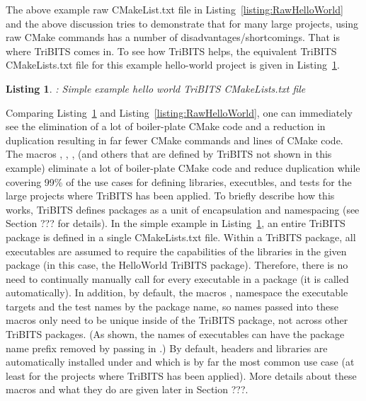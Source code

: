 \documentclass[note]{TechNote}
\newtheorem{listing}{Listing}
\begin{document}
The above example raw CMakeList.txt file in Listing~\ref{listing:RawHelloWorld} and the above discussion tries to demonstrate that for many large projects, using raw CMake commands has a number of disadvantages/shortcomings.  That is where TriBITS comes in.  To see how TriBITS helps, the equivalent TriBITS CMakeLists.txt file for this example hello-world project is given in Listing~\ref{listing:TribitsHelloWorld}.

\begin{listing}: Simple example hello world TriBITS CMakeLists.txt file
\label{listing:TribitsHelloWorld}
{\small

}
\end{listing}

Comparing Listing~\ref{listing:TribitsHelloWorld} and Listing~\ref{listing:RawHelloWorld}, one can immediately see the elimination of a lot of boiler-plate CMake code and a reduction in duplication resulting in far fewer CMake commands and lines of CMake code.  The macros , , ,  (and others that are defined by TriBITS not shown in this example) eliminate a lot of boiler-plate CMake code and reduce duplication while covering 99\% of the use cases for defining libraries, executbles, and tests for the large projects where TriBITS has been applied.  To briefly describe how this works, TriBITS defines packages as a unit of encapsulation and namespacing (see Section ??? for details).  In the simple example in Listing~\ref{listing:TribitsHelloWorld}, an entire TriBITS package is defined in a single CMakeLists.txt file.  Within a TriBITS package, all executables are assumed to require the capabilities of the libraries in the given package (in this case, the HelloWorld TriBITS package).  Therefore, there is no need to continually manually call  for every executable in a package (it is called automatically).  In addition, by default, the macros ,  namespace the executable targets and the test names by the package name, so names passed into these macros only need to be unique inside of the TriBITS package, not across other TriBITS packages.  (As shown, the names of executables can have the package name prefix removed by passing in .)  By default, headers and libraries are automatically installed under  and  which is by far the most common use case (at least for the projects where TriBITS has been applied).  More details about these macros and what they do are given later in Section ???.
\end{document}
